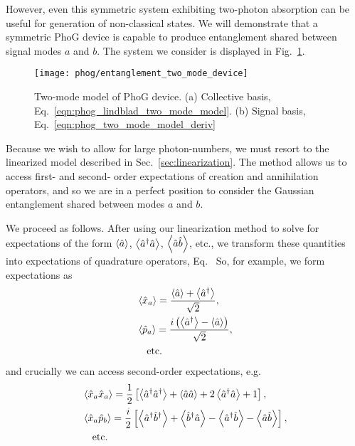 However, even this symmetric system exhibiting two-photon absorption can be useful for generation of non-classical states. We will demonstrate that a symmetric PhoG device is capable to produce entanglement shared between signal modes $a$ and $b$. The system we consider is displayed in Fig.~\ref{fig:phog_entanglement_two_mode_device}.

\begin{figure}[htp]
\centering
\texttt{[image: phog/entanglement\_two\_mode\_device]}
\caption{\label{fig:phog_entanglement_two_mode_device} Two-mode model of PhoG device. (a) Collective basis, Eq.~\ref{eqn:phog_lindblad_two_mode_model}. (b) Signal basis, Eq.~\ref{eqn:phog_two_mode_model_deriv}}
\end{figure}

Because we wish to allow for large photon-numbers, we must resort to the linearized model described in Sec.~\ref{sec:linearization}. The method allows us to access first- and second- order expectations of creation and annihilation operators, and so we are in a perfect position to consider the Gaussian entanglement shared between modes $a$ and $b$. 

We proceed as follows. After using our linearization method to solve for expectations of the form $\ev{\hat{a}}$, $\ev{\hat{a}^\dagger \hat{a}}$, $\ev{\hat{a}\hat{b}}$, etc., we transform these quantities into expectations of quadrature operators, Eq.~ %
So, for example, we form expectations as 
\begin{align}
&\ev{\hat{x}_a} = \frac{\ev{\hat{a}} + \ev{\hat{a}^\dagger}}{\sqrt{2}}, \notag \\
%
&\ev{\hat{p}_a} = \frac{i \left(\ev{\hat{a}^\dagger} - \ev{\hat{a}}\right)}{\sqrt{2}}, \notag \\
%
&\qq{etc.} \notag
\end{align}
and crucially we can access second-order expectations, e.g. 
\begin{align}
&\ev{\hat{x}_a \hat{x}_a} = \frac{1}{2}\left[\ev{\hat{a}^\dagger \hat{a}^\dagger} + \ev{\hat{a} \hat{a}} + 2 \ev{\hat{a}^\dagger \hat{a}} + 1\right], \notag \\
%
&\ev{\hat{x}_a \hat{p}_b} = \frac{i}{2}\left[\ev{\hat{a}^\dagger \hat{b}^\dagger} + \ev{\hat{b}^\dagger \hat{a}} - \ev{\hat{a}^\dagger \hat{b}} - \ev{\hat{a} \hat{b}} \right], \notag \\
%
&\qq{etc.} \notag
\end{align}

